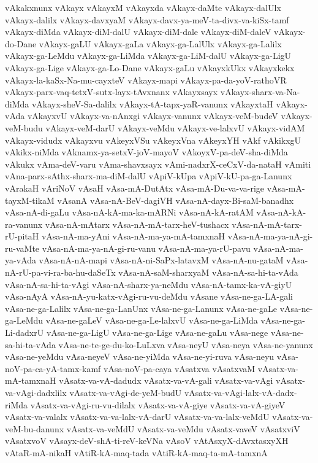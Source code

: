 {vAkakxnunx
vAkayx
vAkayxM
vAkayxda
vAkayx-daMte
vAkayx-dalUlx
vAkayx-dalilx
vAkayx-davxyaM
vAkayx-davx-ya-meV-ta-divx-va-kiSx-tamf
vAkayx-diMda
vAkayx-diM-dalU
vAkayx-diM-dale
vAkayx-diM-daleV
vAkayx-do-Dane
vAkayx-gaLU
vAkayx-gaLa
vAkayx-ga-LalUlx
vAkayx-ga-Lalilx
vAkayx-ga-LeMdu
vAkayx-ga-LiMda
vAkayx-ga-LiM-dalU
vAkayx-ga-LigU
vAkayx-ga-Lige
vAkayx-ga-Lo-Dane
vAkayx-gaLu
vAkayxkUkx
vAkayxkekx
vAkayx-la-kaSx-Na-mu-cayxteV
vAkayx-mapi
vAkayx-pa-da-yoV-rathoVR
vAkayx-parx-vaq-tetxV-sutx-layx-tAvxnanx
vAkayxsayx
vAkayx-sharx-va-Na-diMda
vAkayx-sheV-Sa-dalilx
vAkayx-tA-tapx-yaR-vanunx
vAkayxtaH
vAkayx-vAda
vAkayxvU
vAkayx-va-nAnxgi
vAkayx-vanunx
vAkayx-veM-budeV
vAkayx-veM-budu
vAkayx-veM-darU
vAkayx-veMdu
vAkayx-ve-lalxvU
vAkayx-vidAM
vAkayx-vidudx
vAkayxvu
vAkeyxVSu
vAkeyxVna
vAkeyxYH
vAkf
vAkikxgU
vAkikx-niMda
vAknamx-ya-setxV-joV-mayoV
vAkoyxV-pa-deV-sha-diMda
vAkukx
vAma-deV-varu
vAma-shavxsayx
vAmi-nadxrX-ceCxV-da-nataH
vAmiti
vAna-parx-sAthx-sharx-ma-diM-dalU
vApiV-kUpa
vApiV-kU-pa-ga-Lanunx
vArakaH
vAriNoV
vAsaH
vAsa-mA-DutAtx
vAsa-mA-Du-va-va-rige
vAsa-mA-tayxM-tikaM
vAsanA
vAsa-nA-BeV-dagiVH
vAsa-nA-dayx-Bi-saM-banadhx
vAsa-nA-di-gaLu
vAsa-nA-kA-ma-ka-mARNi
vAsa-nA-kA-ratAM
vAsa-nA-kA-ra-vanunx
vAsa-nA-mAtarx
vAsa-nA-mA-tarx-heV-tushacx
vAsa-nA-mA-tarx-rU-pitaH
vAsa-nA-ma-yAni
vAsa-nA-ma-ya-mA-tamxnaH
vAsa-nA-ma-ya-nA-gi-ru-vaMte
vAsa-nA-ma-ya-nA-gi-ru-vanu
vAsa-nA-ma-ya-rU-pavu
vAsa-nA-ma-ya-vAda
vAsa-nA-nA-mapi
vAsa-nA-ni-SaPx-latavxM
vAsa-nA-nu-gataM
vAsa-nA-rU-pa-vi-ra-ba-hu-daSeTx
vAsa-nA-saM-sharxyaM
vAsa-nA-sa-hi-ta-vAda
vAsa-nA-sa-hi-ta-vAgi
vAsa-nA-sharx-ya-neMdu
vAsa-nA-tamx-ka-vA-giyU
vAsa-nAyA
vAsa-nA-yu-katx-vAgi-ru-vu-deMdu
vAsane
vAsa-ne-ga-LA-gali
vAsa-ne-ga-Lalilx
vAsa-ne-ga-LanUnx
vAsa-ne-ga-Lanunx
vAsa-ne-gaLe
vAsa-ne-ga-LeMdu
vAsa-ne-gaLeV
vAsa-ne-ga-Le-lalxvU
vAsa-ne-ga-LiMda
vAsa-ne-ga-Li-dadxrU
vAsa-ne-ga-LigU
vAsa-ne-ga-Lige
vAsa-ne-gaLu
vAsa-nege
vAsa-ne-sa-hi-ta-vAda
vAsa-ne-te-ge-du-ko-LuLxva
vAsa-neyU
vAsa-neya
vAsa-ne-yanunx
vAsa-ne-yeMdu
vAsa-neyeV
vAsa-ne-yiMda
vAsa-ne-yi-ruva
vAsa-neyu
vAsa-noV-pa-ca-yA-tamx-kamf
vAsa-noV-pa-caya
vAsatxva
vAsatxvaM
vAsatx-va-mA-tamxnaH
vAsatx-va-vA-dadudx
vAsatx-va-vA-gali
vAsatx-va-vAgi
vAsatx-va-vAgi-dadxlilx
vAsatx-va-vAgi-de-yeM-budU
vAsatx-va-vAgi-lalx-vA-dadx-riMda
vAsatx-va-vAgi-ru-vu-dilalx
vAsatx-va-vA-giye
vAsatx-va-vA-giyeV
vAsatx-va-valalx
vAsatx-va-va-lalx-vA-darU
vAsatx-va-va-lalx-veMdU
vAsatx-va-veM-bu-danunx
vAsatx-va-veMdU
vAsatx-va-veMdu
vAsatx-vaveV
vAsatxviV
vAsatxvoV
vAsayx-deV-shA-ti-reV-keVNa
vAsoV
vAtAsxyX-dAvxtasxyXH
vAtaR-mA-nikaH
vAtiR-kA-maq-tada
vAtiR-kA-maq-ta-mA-tamxnA
}
